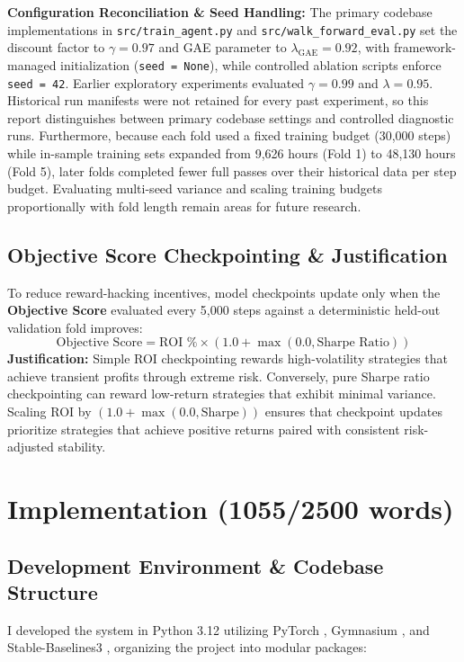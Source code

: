 \documentclass[11pt,a4paper]{article}
\begin{document}
\textbf{Configuration Reconciliation \& Seed Handling:} The primary codebase implementations in \texttt{src/train\_agent.py} and \texttt{src/walk\_forward\_eval.py} set the discount factor to $\gamma = 0.97$ and GAE parameter to $\lambda_{\text{GAE}} = 0.92$, with framework-managed initialization (\texttt{seed = None}), while controlled ablation scripts enforce \texttt{seed = 42}. Earlier exploratory experiments evaluated $\gamma = 0.99$ and $\lambda = 0.95$. Historical run manifests were not retained for every past experiment, so this report distinguishes between primary codebase settings and controlled diagnostic runs. Furthermore, because each fold used a fixed training budget (30,000 steps) while in-sample training sets expanded from 9,626 hours (Fold 1) to 48,130 hours (Fold 5), later folds completed fewer full passes over their historical data per step budget. Evaluating multi-seed variance and scaling training budgets proportionally with fold length remain areas for future research.

\subsection{Objective Score Checkpointing \& Justification}
To reduce reward-hacking incentives, model checkpoints update only when the \textbf{Objective Score} evaluated every 5,000 steps against a deterministic held-out validation fold improves:
\begin{equation}
\text{Objective Score} = \text{ROI \%} \times \left(1.0 + \max(0.0, \text{Sharpe Ratio})\right)
\end{equation}
\textbf{Justification:} Simple ROI checkpointing rewards high-volatility strategies that achieve transient profits through extreme risk. Conversely, pure Sharpe ratio checkpointing can reward low-return strategies that exhibit minimal variance. Scaling ROI by $(1.0 + \max(0.0, \text{Sharpe}))$ ensures that checkpoint updates prioritize strategies that achieve positive returns paired with consistent risk-adjusted stability.

\section{Implementation (1055/2500 words)}

\subsection{Development Environment \& Codebase Structure}
I developed the system in Python 3.12 utilizing PyTorch \cite{paszke2019}, Gymnasium \cite{towers2024}, and Stable-Baselines3 \cite{raffin2021}, organizing the project into modular packages:
\end{document}
